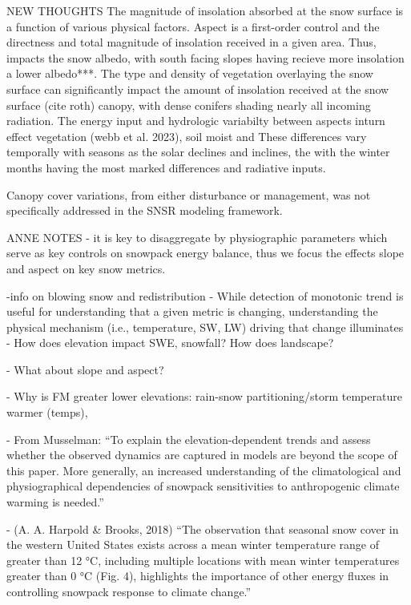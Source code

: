 NEW THOUGHTS
The magnitude of insolation absorbed at the snow surface is a function of various physical factors. Aspect is a first-order control and the directness and total magnitude of insolation received in a given area. Thus, impacts the snow albedo, with south facing slopes having recieve more insolation a lower albedo***. The type and density of vegetation overlaying the snow surface can significantly impact the amount of insolation received at the snow surface (cite roth) canopy, with dense conifers shading nearly all incoming radiation. The energy input and hydrologic variabilty between aspects inturn effect vegetation (webb et al. 2023), soil moist  and  These differences vary temporally with seasons as the solar declines and inclines, the with the winter months having the most marked differences and radiative inputs.


Canopy cover variations, from either disturbance or management, was not specifically addressed in the SNSR modeling framework.  



ANNE NOTES
- it is key to disaggregate by physiographic parameters which serve as key controls on snowpack energy balance, thus we focus the effects slope and aspect on key snow metrics. \

-info on blowing snow and redistribution
- While detection of monotonic trend is useful for understanding that a given metric is changing, understanding the physical mechanism (i.e., temperature, SW, LW) driving that change illuminates 
-	How does elevation impact SWE, snowfall? How does landscape? \

-	What about slope and aspect? \citep{dozierRevisitingTopographicHorizons2022, dozierApproachEnergyBalance1979} \

-	Why is FM greater lower elevations: rain-snow partitioning/storm temperature \citep{huWidespreadWarmingTrends2020} warmer (temps), \

-	From Musselman: “To explain the elevation-dependent trends and assess whether the observed dynamics are captured in models are beyond the scope of this paper. More generally, an increased understanding of the climatological and physiographical dependencies of snowpack sensitivities to anthropogenic climate warming is needed.” \

-	(A. A. Harpold \& Brooks, 2018) “The observation that seasonal snow cover in the western United States exists across a mean winter temperature range of greater than 12 °C, including multiple locations with mean winter temperatures greater than 0 °C (Fig. 4), highlights the importance of other energy fluxes in controlling snowpack response to climate change.” \

